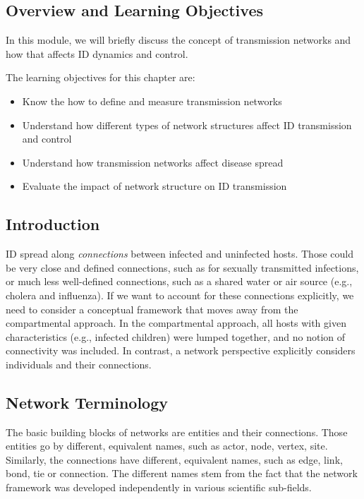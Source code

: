 \documentclass[]{article}
\providecommand{\tightlist}{%
  \setlength{\itemsep}{0pt}\setlength{\parskip}{0pt}}
\theoremstyle{definition}
\theoremstyle{definition}
\theoremstyle{definition}
\theoremstyle{remark}
\begin{document}
\subsection{Overview and Learning
Objectives}\label{overview-and-learning-objectives-13}

In this module, we will briefly discuss the concept of transmission
networks and how that affects ID dynamics and control.

The learning objectives for this chapter are:

\begin{itemize}
\tightlist
\item
  Know the how to define and measure transmission networks
\item
  Understand how different types of network structures affect ID
  transmission and control
\item
  Understand how transmission networks affect disease spread
\item
  Evaluate the impact of network structure on ID transmission
\end{itemize}

\subsection{Introduction}\label{introduction-12}

ID spread along \emph{connections} between infected and uninfected
hosts. Those could be very close and defined connections, such as for
sexually transmitted infections, or much less well-defined connections,
such as a shared water or air source (e.g., cholera and influenza). If
we want to account for these connections explicitly, we need to consider
a conceptual framework that moves away from the compartmental approach.
In the compartmental approach, all hosts with given characteristics
(e.g., infected children) were lumped together, and no notion of
connectivity was included. In contrast, a network perspective explicitly
considers individuals and their connections.

\subsection{Network Terminology}\label{network-terminology}

The basic building blocks of networks are entities and their
connections. Those entities go by different, equivalent names, such as
actor, node, vertex, site. Similarly, the connections have different,
equivalent names, such as edge, link, bond, tie or connection. The
different names stem from the fact that the network framework was
developed independently in various scientific sub-fields.
\end{document}
